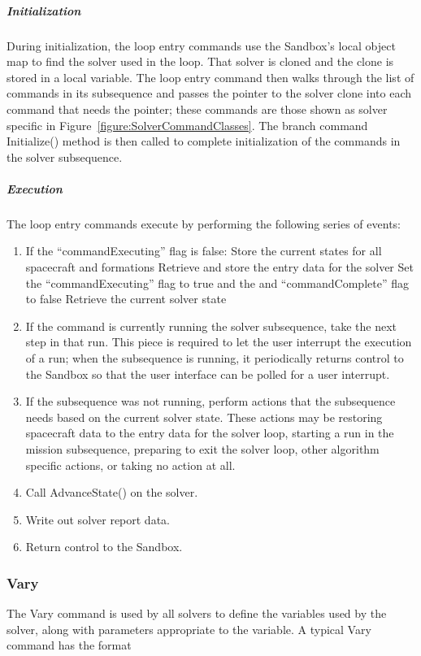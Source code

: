 \subparagraph{Initialization}  During initialization, the loop entry commands use the Sandbox's
local object map to find the solver used in the loop.  That solver is cloned and the clone is stored
in a local variable.  The loop entry command then walks through the list of commands in its
subsequence and passes the pointer to the solver clone into each command that needs the pointer;
these commands are those shown as solver specific in Figure~\ref{figure:SolverCommandClasses}.  The
branch command Initialize() method is then called to complete initialization of the commands in the
solver subsequence.

\subparagraph{Execution}  The loop entry commands execute by performing the following series of
events:

\begin{enumerate}
\item If the ``commandExecuting'' flag is false:
\subitem Store the current states for all spacecraft and formations
\subitem Retrieve and store the entry data for the solver
\subitem Set the ``commandExecuting'' flag to true and the and ``commandComplete'' flag to false
\subitem Retrieve the current solver state
\item \label{item:solverLoopReentryPoint} If the command is currently running the solver
subsequence, take the next step in that run. This piece is required to let the user interrupt the
execution of a run; when the subsequence is running, it periodically returns control to the Sandbox
so that the user interface can be polled for a user interrupt.
\item If the subsequence was not running, perform actions that the subsequence needs based on the
current solver state.  These actions may be restoring spacecraft data to the entry data for the
solver loop, starting a run in the mission subsequence, preparing to exit the solver loop, other
algorithm specific actions, or taking no action at all.
\item Call AdvanceState() on the solver.
\item Write out solver report data.
\item Return control to the Sandbox.
\end{enumerate}

\subsubsection{Vary}

The Vary command is used by all solvers to define the variables used by the solver, along with
parameters appropriate to the variable.  A typical Vary command has the format

